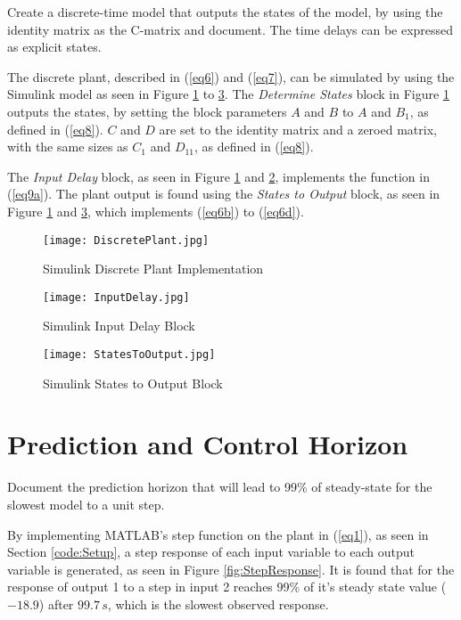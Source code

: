 \documentclass[12pt]{article}
\newenvironment{problem}[2][Problem]{\begin{trivlist}
		\item[\hskip \labelsep {\bfseries #1}\hskip \labelsep {\bfseries #2.}]}{\end{trivlist}}
\begin{document}
\begin{problem}{4} Create a discrete-time model that outputs the states of the model, by using the identity matrix as the C-matrix and document. The time delays can be expressed as explicit states. \end{problem}

The discrete plant, described in (\ref{eq6}) and (\ref{eq7}), can be simulated by using the Simulink model as seen in Figure \ref{fig:DiscretePlant} to \ref{fig:StatesToOutput}. The \textit{Determine States} block in Figure \ref{fig:DiscretePlant} outputs the states, by setting the block parameters $A$ and $B$ to $A$ and $B_1$, as defined in (\ref{eq8}). $C$ and $D$ are set to the identity matrix and a zeroed matrix, with the same sizes as $C_1$ and $D_{11}$, as defined in (\ref{eq8}).

The \textit{Input Delay} block, as seen in Figure \ref{fig:DiscretePlant} and \ref{fig:InputDelay}, implements the function in (\ref{eq9a}). The plant output is found using the \textit{States to Output} block, as seen in Figure \ref{fig:DiscretePlant} and \ref{fig:StatesToOutput}, which implements (\ref{eq6b}) to (\ref{eq6d}).

\begin{figure}[H]
	\texttt{[image: DiscretePlant.jpg]}
	\centering
	\caption{Simulink Discrete Plant Implementation}
	\label{fig:DiscretePlant}
\end{figure}

\begin{figure}[H]
	\texttt{[image: InputDelay.jpg]}
	\centering
	\caption{Simulink Input Delay Block}
	\label{fig:InputDelay}
\end{figure}

\begin{figure}[H]
	\texttt{[image: StatesToOutput.jpg]}
	\centering
	\caption{Simulink States to Output Block}
	\label{fig:StatesToOutput}
\end{figure}

\section{Prediction and Control Horizon}

\begin{problem}{5} Document the prediction horizon that will lead to 99\% of steady-state for the slowest model to a unit step. \end{problem}

By implementing MATLAB's step function on the plant in (\ref{eq1}), as seen in Section \ref{code:Setup}, a step response of each input variable to each output variable is generated, as seen in Figure \ref{fig:StepResponse}. It is found that for the response of output 1 to a step in input 2 reaches 99\% of it's steady state value ($-18.9$) after $ 99.7 \, s $, which is the slowest observed response.
\end{document}
